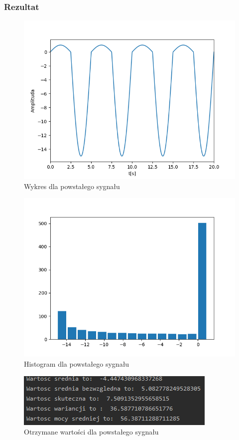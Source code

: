 \documentclass[12pt]{article}
\begin{document}
\subsubsection{Rezultat}
\begin{figure}[H]
\centering
\includegraphics[scale=0.8]{dzielenieSinusProstWykres.png}
\caption{Wykres dla powstałego sygnału}
\end{figure}
\begin{figure}[H]
\centering
\includegraphics[scale=0.8]{dzielenieSinusProstHist.png}
\caption{Histogram dla powstałego sygnału}
\end{figure}
\begin{figure}[H]
\centering
\includegraphics[scale=0.8]{dzielenieSinusProstParam.png}
\caption{Otrzymane wartości dla powstałego sygnału}
\end{figure}
\end{document}
